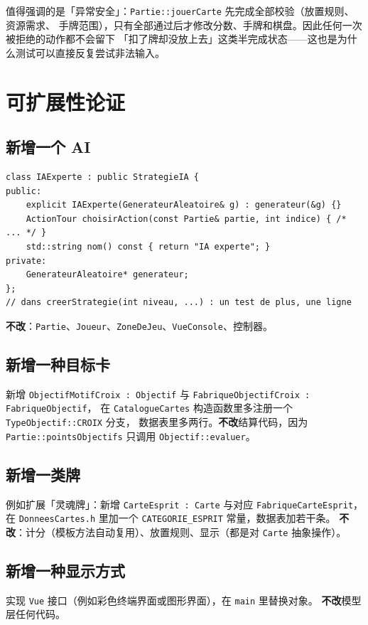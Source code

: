 \documentclass[11pt,a4paper]{ctexart}
\newcommand{\cl}[1]{\texttt{#1}}
\begin{document}
值得强调的是「异常安全」：\cl{Partie::jouerCarte} 先完成全部校验（放置规则、资源需求、
手牌范围），只有全部通过后才修改分数、手牌和棋盘。因此任何一次被拒绝的动作都不会留下
「扣了牌却没放上去」这类半完成状态——这也是为什么测试可以直接反复尝试非法输入。

\section{可扩展性论证}
\label{sec:extensible}

\subsection{新增一个 AI}
\begin{lstlisting}
class IAExperte : public StrategieIA {
public:
    explicit IAExperte(GenerateurAleatoire& g) : generateur(&g) {}
    ActionTour choisirAction(const Partie& partie, int indice) { /* ... */ }
    std::string nom() const { return "IA experte"; }
private:
    GenerateurAleatoire* generateur;
};
// dans creerStrategie(int niveau, ...) : un test de plus, une ligne
\end{lstlisting}
\textbf{不改}：\cl{Partie}、\cl{Joueur}、\cl{ZoneDeJeu}、\cl{VueConsole}、控制器。

\subsection{新增一种目标卡}
新增 \cl{ObjectifMotifCroix : Objectif} 与 \cl{FabriqueObjectifCroix : FabriqueObjectif}，
在 \cl{CatalogueCartes} 构造函数里多注册一个 \cl{TypeObjectif::CROIX} 分支，
数据表里多两行。\textbf{不改}结算代码，因为 \cl{Partie::pointsObjectifs} 只调用
\cl{Objectif::evaluer}。

\subsection{新增一类牌}
例如扩展「灵魂牌」：新增 \cl{CarteEsprit : Carte} 与对应 \cl{FabriqueCarteEsprit}，
在 \cl{DonneesCartes.h} 里加一个 \cl{CATEGORIE\_ESPRIT} 常量，数据表加若干条。
\textbf{不改}：计分（模板方法自动复用）、放置规则、显示（都是对 \cl{Carte} 抽象操作）。

\subsection{新增一种显示方式}
实现 \cl{Vue} 接口（例如彩色终端界面或图形界面），在 \cl{main} 里替换对象。
\textbf{不改}模型层任何代码。
\end{document}
